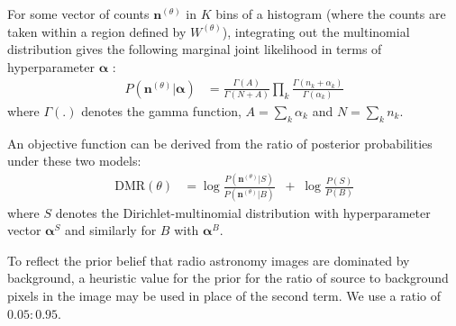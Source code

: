 \documentclass[
    ,final            %
  ]
  {aipproc}
\begin{document}
For some vector of counts $\textbf{n}^{(\theta)}$ in $K$ bins of a histogram (where the counts are taken within a region defined by $W^{(\theta)}$), integrating out the multinomial distribution gives the following marginal joint likelihood in terms of hyperparameter $\boldsymbol{\alpha}$ \cite{ng2011dirichlet}:
\begin{align}
P(\textbf{n}^{(\theta)}|\boldsymbol{\alpha}) &= \frac{\Gamma(A)}{\Gamma(N+A)} \prod_k \frac{\Gamma(n_k+\alpha_k)}{\Gamma(\alpha_k)}  \label{eq:muldir} 
\end{align}
where $\Gamma(.)$ denotes the gamma function, $A = \sum_k \alpha_k$ and $N = \sum_k n_k$. 


An objective  function can be derived from the ratio of posterior probabilities \cite{kass1995bayes} under these two models:
\begin{align}
\text{DMR}(\theta) 
&= \log \frac{P(\textbf{n}^{(\theta)} | S)}{P(\textbf{n}^{(\theta)} | B)} \;\; + \; \log \frac{P(S)}{P(B)}\label{eq:score2}
\end{align}
where $S$ denotes the Dirichlet-multinomial distribution with hyperparameter vector $\boldsymbol{\alpha}^S$ and similarly for $B$ with $\boldsymbol{\alpha}^B$.

To reflect the prior belief that radio astronomy images are dominated
by background, a heuristic value for the prior for the ratio of source
to background pixels in the image may be used in place of the second
term. We use a ratio of $0.05 : 0.95$.
\end{document}
